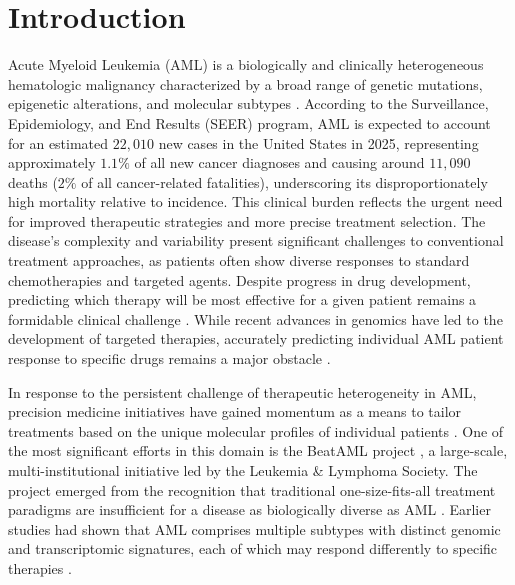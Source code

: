 \documentclass[pdflatex,sn-mathphys-num]{sn-jnl}
\theoremstyle{thmstyleone}
\theoremstyle{thmstyletwo}
\theoremstyle{thmstylethree}
\begin{document}

\maketitle

\section{Introduction}\label{sec1}
Acute Myeloid Leukemia (AML) is a biologically and clinically heterogeneous hematologic malignancy characterized by a broad range of genetic mutations, epigenetic alterations, and molecular subtypes \cite{cancer2013genomic,papaemmanuil2016genomic,kurzer2023updates,tyner2018functional}. According to the Surveillance, Epidemiology, and End Results (SEER) program, AML is expected to account for an estimated $22{,}010$ new cases in the United States in 2025, representing approximately $1.1\%$ of all new cancer diagnoses and causing around $11{,}090$ deaths ($2\%$ of all cancer-related fatalities), underscoring its disproportionately high mortality relative to incidence. This clinical burden reflects the urgent need for improved therapeutic strategies and more precise treatment selection. The disease's complexity and variability present significant challenges to conventional treatment approaches, as patients often show diverse responses to standard chemotherapies and targeted agents. Despite progress in drug development, predicting which therapy will be most effective for a given patient remains a formidable clinical challenge \cite{tyner2018functional,yu2020advances}. While recent advances in genomics have led to the development of targeted therapies, accurately predicting individual AML patient response to specific drugs remains a major obstacle \cite{shafiei2025omics}.

In response to the persistent challenge of therapeutic heterogeneity in AML, precision medicine initiatives have gained momentum as a means to tailor treatments based on the unique molecular profiles of individual patients \cite{lohse2018precision}. One of the most significant efforts in this domain is the BeatAML project \cite{tyner2018functional}, a large-scale, multi-institutional initiative led by the Leukemia \& Lymphoma Society. The project emerged from the recognition that traditional one-size-fits-all treatment paradigms are insufficient for a disease as biologically diverse as AML \cite{bottomly2022integrative}. Earlier studies had shown that AML comprises multiple subtypes with distinct genomic and transcriptomic signatures, each of which may respond differently to specific therapies \cite{mo2023integrative,bottomly2022integrative}.
\end{document}
